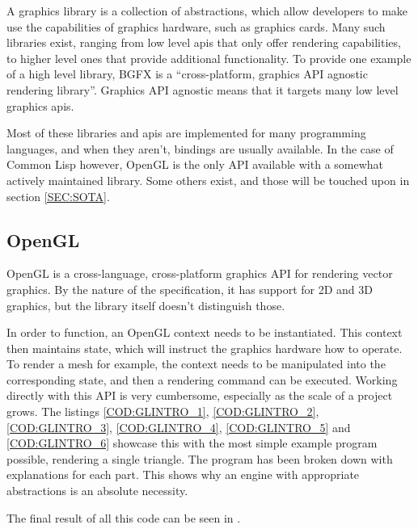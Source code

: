 A graphics library is a collection of abstractions,
which allow developers to make use the capabilities of graphics hardware,
such as graphics cards.
Many such libraries exist,
ranging from low level \ac{api}s that only offer rendering capabilities,
to higher level ones that provide additional functionality.
To provide one example of a high level library,
BGFX is a ``cross-platform, graphics API agnostic rendering library''.
Graphics API agnostic means that it targets many low level graphics \ac{api}s.

Most of these libraries and \ac{api}s are implemented for many programming languages,
and when they aren't,
bindings are usually available.
In the case of Common Lisp however,
OpenGL is the only API available with a somewhat actively maintained library.
Some others exist,
and those will be touched upon in section \ref{SEC:SOTA}.

\subsection{OpenGL}

OpenGL is a cross-language,
cross-platform graphics API for rendering vector graphics.
By the nature of the specification,
it has support for 2D and 3D graphics,
but the library itself doesn't distinguish those.

In order to function,
an OpenGL context needs to be instantiated.
This context then maintains state,
which will instruct the graphics hardware how to operate.
To render a mesh for example,
the context needs to be manipulated into the corresponding state,
and then a rendering command can be executed.
Working directly with this API is very cumbersome,
especially as the scale of a project grows.
The listings \ref{COD:GLINTRO_1},
\ref{COD:GLINTRO_2},
\ref{COD:GLINTRO_3},
\ref{COD:GLINTRO_4},
\ref{COD:GLINTRO_5} and \ref{COD:GLINTRO_6}
showcase this with the most simple example program possible,
rendering a single triangle.
The program has been broken down with explanations for each part.
This shows why an engine with appropriate abstractions is an absolute necessity.

The final result of all this code can be seen in .


